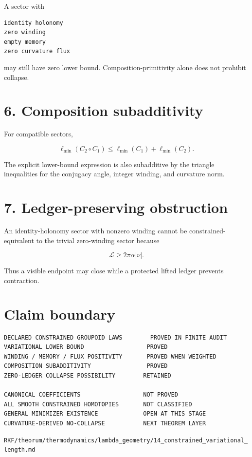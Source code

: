 A sector with

\begin{verbatim}
identity holonomy
zero winding
empty memory
zero curvature flux
\end{verbatim}

may still have zero lower bound. Composition-primitivity alone does not prohibit collapse.

\hypertarget{composition-subadditivity}{%
\section{6. Composition subadditivity}\label{composition-subadditivity}}

For compatible sectors,

\[
\ell_{\min}(C_2\circ C_1)
\le
\ell_{\min}(C_1)+\ell_{\min}(C_2).
\]

The explicit lower-bound expression is also subadditive by the triangle inequalities for the conjugacy angle, integer winding, and curvature norm.

\hypertarget{ledger-preserving-obstruction}{%
\section{7. Ledger-preserving obstruction}\label{ledger-preserving-obstruction}}

An identity-holonomy sector with nonzero winding cannot be constrained-equivalent to the trivial zero-winding sector because

\[
\mathcal L\ge2\pi\alpha|\nu|.
\]

Thus a visible endpoint may close while a protected lifted ledger prevents contraction.

\hypertarget{claim-boundary}{%
\section{Claim boundary}\label{claim-boundary}}

\begin{verbatim}
DECLARED CONSTRAINED GROUPOID LAWS        PROVED IN FINITE AUDIT
VARIATIONAL LOWER BOUND                  PROVED
WINDING / MEMORY / FLUX POSITIVITY       PROVED WHEN WEIGHTED
COMPOSITION SUBADDITIVITY                PROVED
ZERO-LEDGER COLLAPSE POSSIBILITY        RETAINED

CANONICAL COEFFICIENTS                  NOT PROVED
ALL SMOOTH CONSTRAINED HOMOTOPIES       NOT CLASSIFIED
GENERAL MINIMIZER EXISTENCE             OPEN AT THIS STAGE
CURVATURE-DERIVED NO-COLLAPSE           NEXT THEOREM LAYER
\end{verbatim}

\begin{flushright}\small\texttt{RKF/theorum/thermodynamics/lambda\_geometry/14\_constrained\_variational\_length.md}\end{flushright}
